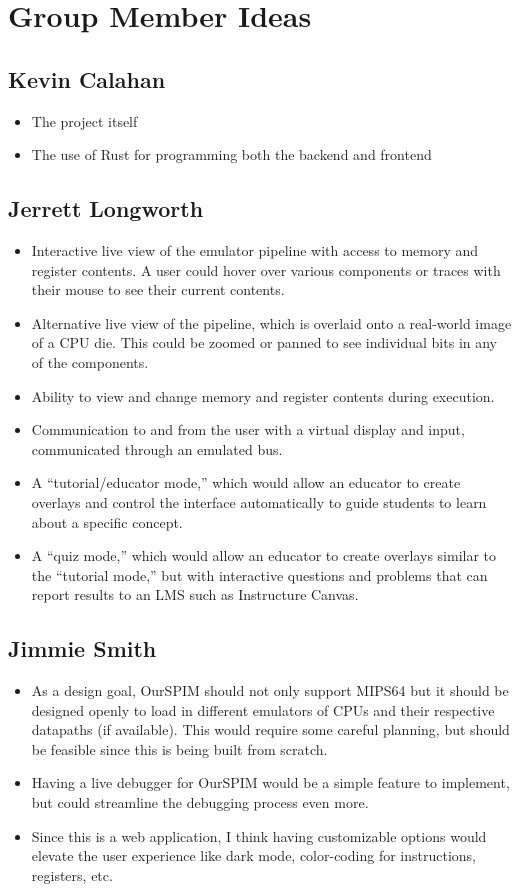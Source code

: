\documentclass[parskip=half, fontsize=12pt]{scrartcl}
\begin{document}
\section{Group Member Ideas}
\subsection{Kevin Calahan}
\begin{itemize}
    \item The project itself
    \item The use of Rust for programming both the backend and frontend
\end{itemize}


\subsection{Jerrett Longworth}
\begin{itemize}
    \item Interactive live view of the emulator pipeline with access to memory and register contents. A user could hover over various components or traces with their mouse to see their current contents.
    \item Alternative live view of the pipeline, which is overlaid onto a real-world image of a CPU die. This could be zoomed or panned to see individual bits in any of the components.
    \item Ability to view and change memory and register contents during execution.
    \item Communication to and from the user with a virtual display and input, communicated through an emulated bus.
    \item A ``tutorial/educator mode,'' which would allow an educator to create overlays and control the interface automatically to guide students to learn about a specific concept.
    \item A ``quiz mode,'' which would allow an educator to create overlays similar to the ``tutorial mode,'' but with interactive questions and problems that can report results to an LMS such as Instructure Canvas.
\end{itemize}


\subsection{Jimmie Smith}
\begin{itemize}
    \item As a design goal, OurSPIM should not only support MIPS64 but it should be designed openly to load in different emulators of CPUs and their respective datapaths (if available). This would require some careful planning, but should be feasible since this is being built from scratch.
    \item Having a live debugger for OurSPIM would be a simple feature to implement, but could streamline the debugging process even more. 
    \item Since this is a web application, I think having customizable options would elevate the user experience like dark mode, color-coding for instructions, registers, etc. 
\end{itemize}
\end{document}
